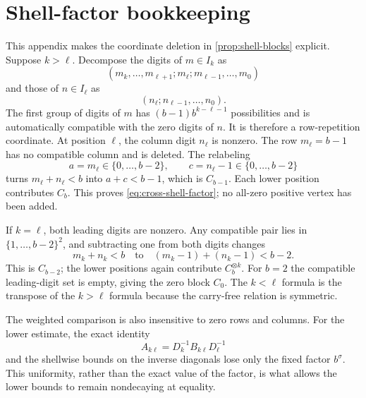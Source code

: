\section{Shell-factor bookkeeping}
\label{app:shells}

This appendix makes the coordinate deletion in
\cref{prop:shell-blocks} explicit.  Suppose \(k>\ell\).  Decompose the
digits of \(m\in I_k\) as
\[
  (
    m_k,\ldots,m_{\ell+1};
    m_\ell;
    m_{\ell-1},\ldots,m_0
  )
\]
and those of \(n\in I_\ell\) as
\[
  (
    n_\ell;
    n_{\ell-1},\ldots,n_0
  ).
\]
The first group of digits of \(m\) has
\((b-1)b^{k-\ell-1}\) possibilities and is automatically compatible with
the zero digits of \(n\).  It is therefore a row-repetition coordinate.
At position \(\ell\), the column digit \(n_\ell\) is nonzero.  The row
\(m_\ell=b-1\) has no compatible column and is deleted.  The relabeling
\[
  a=m_\ell\in\{0,\ldots,b-2\},
  \qquad
  c=n_\ell-1\in\{0,\ldots,b-2\}
\]
turns \(m_\ell+n_\ell<b\) into \(a+c<b-1\), which is \(C_{b-1}\).
Each lower position contributes \(C_b\).  This proves
\cref{eq:cross-shell-factor}; no all-zero positive vertex has been added.

If \(k=\ell\), both leading digits are nonzero.  Any compatible pair lies
in \(\{1,\ldots,b-2\}^2\), and subtracting one from both digits changes
\[
  m_k+n_k<b
  \quad\text{to}\quad
  (m_k-1)+(n_k-1)<b-2.
\]
This is \(C_{b-2}\); the lower positions again contribute
\(C_b^{\otimes k}\).  For \(b=2\) the compatible leading-digit set is
empty, giving the zero block \(C_0\).  The \(k<\ell\) formula is the
transpose of the \(k>\ell\) formula because the carry-free relation is
symmetric.

The weighted comparison is also insensitive to zero rows and columns.
For the lower estimate, the exact identity
\[
  A_{k\ell}=D_k^{-1}B_{k\ell}D_\ell^{-1}
\]
and the shellwise bounds on the inverse diagonals lose only the fixed
factor \(b^\sigma\).  This uniformity, rather than the exact value of the
factor, is what allows the lower bounds to remain nondecaying at equality.
